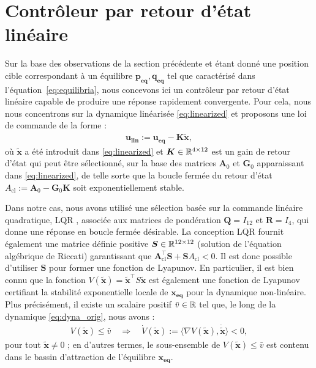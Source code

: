 \section{Contrôleur par retour d'état linéaire}
\label{sec:ctrlLin}
Sur la base des observations de la section précédente et étant donné une position cible correspondant à un équilibre $\boldsymbol{p_{\text{eq}}}, \boldsymbol{q_{\text{eq}}}$ tel que caractérisé dans l'équation~\eqref{eq:equilibria}, nous concevons ici un contrôleur par retour d'état linéaire capable de produire une réponse rapidement convergente. Pour cela, nous nous concentrons sur la dynamique linéarisée \eqref{eq:linearized} et proposons une loi de commande de la forme :
\begin{align}
  \boldsymbol{u_{\text{lin}}} := \boldsymbol{u_{\text{eq}}} - \boldsymbol{K} \boldsymbol{\tilde x},
\label{eq:u_lin}
\end{align}
où $\boldsymbol{\tilde x}$ a été introduit dans \eqref{eq:linearized} et $\boldsymbol{K} \in {\mathbb R}^{4 \times 12}$ est un gain de retour d'état qui peut être sélectionné, sur la base des matrices $\boldsymbol{A}_{0}$ et $\boldsymbol{G}_{0}$ apparaissant dans \eqref{eq:linearized}, de telle sorte que la boucle fermée du retour d'état $A_{\text{cl}}:=\boldsymbol{A}_{0}-\boldsymbol{G}_{0}\boldsymbol{K}$ soit exponentiellement stable. 

Dans notre cas, nous avons utilisé une sélection basée sur la commande linéaire quadratique, LQR , associée aux matrices de pondération $\boldsymbol{Q} = I_{12}$ et $\boldsymbol{R} = I_{4}$, qui donne une réponse en boucle fermée désirable. La conception LQR fournit également une matrice définie positive  $\boldsymbol{S} \in {\mathbb R}^{12 \times 12}$ (solution de l'équation algébrique de Riccati) garantissant que $\boldsymbol{A}_{\text{cl}}^\top \boldsymbol{S} + \boldsymbol{S} A_{\text{cl}} <0$. Il est donc possible d'utiliser $\boldsymbol{S}$ pour former une fonction de Lyapunov.  En particulier, il est bien connu que la fonction $V(\boldsymbol{\tilde x}) = \boldsymbol{\tilde x}^\top S \boldsymbol{\tilde x}$ est également une fonction de Lyapunov certifiant la stabilité exponentielle locale de $\boldsymbol{x_{\text{eq}}}$ pour la dynamique non-linéaire. Plus précisément, il existe un scalaire positif $\bar v \in {\mathbb R}$ tel que, le long de la dynamique \eqref{eq:dyna_orig}, nous avons :
\begin{align}
\label{eq:Vdecrease}
  V(\boldsymbol{\tilde x}) \leq \bar v \quad \Rightarrow \quad \dot V(\boldsymbol{\tilde x}) := \langle 
\nabla V(\boldsymbol{\tilde x}), \boldsymbol{\dot{\tilde x}}\rangle <0,
\end{align}
pour tout $\boldsymbol{\tilde x} \neq 0$ ; en d'autres termes, le sous-ensemble de $V(\boldsymbol{\tilde x}) \leq \bar v$ est contenu dans le bassin d'attraction de l'équilibre $\boldsymbol{x_{\text{eq}}}$.

